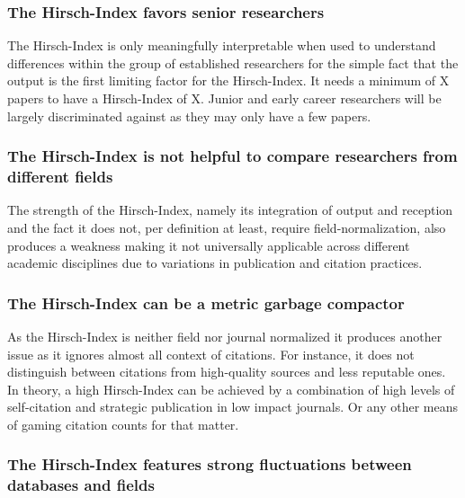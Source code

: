 \documentclass[
  letterpaper,
]{scrreprt}
\begin{document}
\subsubsection{The Hirsch-Index favors senior
researchers}\label{the-hirsch-index-favors-senior-researchers}

The Hirsch-Index is only meaningfully interpretable when used to
understand differences within the group of established researchers for
the simple fact that the output is the first limiting factor for the
Hirsch-Index. It needs a minimum of X papers to have a Hirsch-Index of
X. Junior and early career researchers will be largely discriminated
against as they may only have a few papers.

\subsubsection{The Hirsch-Index is not helpful to compare researchers
from different
fields}\label{the-hirsch-index-is-not-helpful-to-compare-researchers-from-different-fields}

The strength of the Hirsch-Index, namely its integration of output and
reception and the fact it does not, per definition at least, require
field-normalization, also produces a weakness making it not universally
applicable across different academic disciplines due to variations in
publication and citation practices.

\subsubsection{The Hirsch-Index can be a metric garbage
compactor}\label{the-hirsch-index-can-be-a-metric-garbage-compactor}

As the Hirsch-Index is neither field nor journal normalized it produces
another issue as it ignores almost all context of citations. For
instance, it does not distinguish between citations from high-quality
sources and less reputable ones. In theory, a high Hirsch-Index can be
achieved by a combination of high levels of self-citation and strategic
publication in low impact journals. Or any other means of gaming
citation counts for that matter.

\subsubsection{The Hirsch-Index features strong fluctuations between
databases and
fields}\label{the-hirsch-index-features-strong-fluctuations-between-databases-and-fields}
\end{document}
